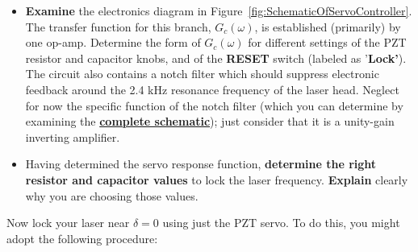 \documentclass{../lab}
\begin{document}
\begin{itemize}
    \item \textbf{Examine} the electronics diagram in Figure~\ref{fig:SchematicOfServoController}. The transfer function for this branch, $G_c(\omega)$, is established (primarily) by one op-amp. Determine the form of $G_c(\omega)$ for different settings of the PZT resistor and capacitor knobs, and of the \textbf{RESET} switch (labeled as '\textbf{Lock'}). The circuit also contains a notch filter which should suppress electronic feedback around the 2.4 kHz resonance frequency of the laser head. Neglect for now the specific function of the notch filter (which you can determine by examining the \href{https://berkeley-physics111b.github.io/assets/pdf/oldwebsitestructure/images/Full\_schematic.pdf}{\textbf{complete schematic}}); just consider that it is a unity-gain inverting amplifier.

    \item Having determined the servo response function, \textbf{determine the right resistor and capacitor values} to lock the laser frequency. \textbf{Explain} clearly why you are choosing those values.
\end{itemize}

Now lock your laser near $\delta = 0$ using just the PZT servo. To do this, you might adopt the following procedure:
\end{document}
